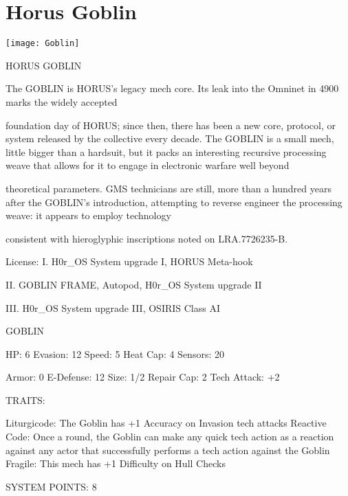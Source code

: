\section{Horus Goblin}

\begin{center}
    \texttt{[image: Goblin]}
\end{center}

                                          HORUS GOBLIN

The GOBLIN is HORUS’s legacy mech core. Its leak into the Omninet in 4900 marks the widely accepted

foundation day of HORUS; since then, there has been a new core, protocol, or system released by the
collective every decade. The GOBLIN is a small mech, little bigger than a hardsuit, but it packs an
interesting recursive processing weave that allows for it to engage in electronic warfare well beyond

theoretical parameters. GMS technicians are still, more than a hundred years after the GOBLIN’s
introduction, attempting to reverse engineer the processing weave: it appears to employ technology

consistent with hieroglyphic inscriptions noted on LRA.7726235-B.

                                                  License:
I. H0r\_OS System upgrade I, HORUS Meta-hook

II. GOBLIN FRAME, Autopod, H0r\_OS System upgrade II

III. H0r\_OS System upgrade III, OSIRIS Class AI


                                                  GOBLIN

  HP: 6          Evasion: 12                          Speed: 5           Heat Cap: 4       Sensors: 20

  Armor: 0       E-Defense: 12                        Size: 1/2          Repair Cap: 2     Tech Attack:
                                                                                           +2

                                                   TRAITS:

  Liturgicode: The Goblin has +1 Accuracy on Invasion tech attacks
  Reactive Code: Once a round, the Goblin can make any quick tech action as a reaction against
  any actor that successfully performs a tech action against the Goblin
  Fragile: This mech has +1 Difficulty on Hull Checks

                                            SYSTEM POINTS: 8


